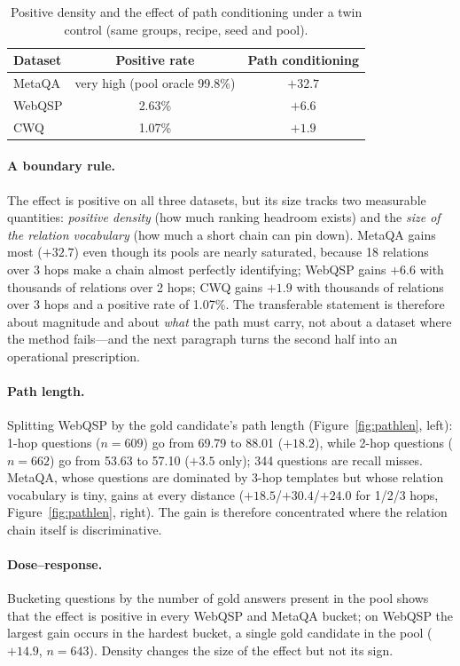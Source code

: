 \documentclass[sigconf,review,anonymous]{acmart}
\begin{document}
\begin{table}[t]
\centering\small
\caption{Positive density and the effect of path conditioning under a twin control (same groups, recipe, seed and pool).}
\label{tab:density}
\begin{tabular}{lcc}
\toprule
Dataset & Positive rate & Path conditioning \\
\midrule
MetaQA & very high (pool oracle 99.8\%) & $\mathbf{+32.7}$ \\
WebQSP & 2.63\% & $\mathbf{+6.6}$ \\
CWQ & 1.07\% & $\mathbf{+1.9}$ \\
\bottomrule
\end{tabular}
\end{table}

\paragraph{A boundary rule.}
The effect is positive on all three datasets, but its size tracks two measurable quantities: \emph{positive density} (how much ranking headroom exists) and the \emph{size of the relation vocabulary} (how much a short chain can pin down). MetaQA gains most ($+32.7$) even though its pools are nearly saturated, because 18 relations over 3 hops make a chain almost perfectly identifying; WebQSP gains $+6.6$ with thousands of relations over 2 hops; CWQ gains $+1.9$ with thousands of relations over 3 hops and a positive rate of 1.07\%. The transferable statement is therefore about magnitude and about \emph{what} the path must carry, not about a dataset where the method fails---and the next paragraph turns the second half into an operational prescription.

\paragraph{Path length.}
Splitting WebQSP by the gold candidate's path length (Figure~\ref{fig:pathlen}, left): 1-hop questions ($n=609$) go from 69.79 to 88.01 ($+18.2$), while 2-hop questions ($n=662$) go from 53.63 to 57.10 ($+3.5$ only); 344 questions are recall misses. MetaQA, whose questions are dominated by 3-hop templates but whose relation vocabulary is tiny, gains at every distance ($+18.5$/$+30.4$/$+24.0$ for 1/2/3 hops, Figure~\ref{fig:pathlen}, right). The gain is therefore concentrated where the relation chain itself is discriminative.

\paragraph{Dose--response.}
Bucketing questions by the number of gold answers present in the pool shows that the effect is positive in every WebQSP and MetaQA bucket; on WebQSP the largest gain occurs in the hardest bucket, a single gold candidate in the pool ($+14.9$, $n=643$). Density changes the size of the effect but not its sign.
\end{document}
